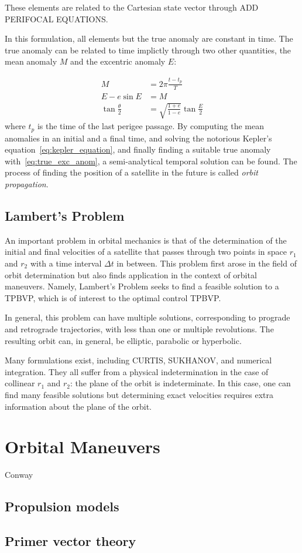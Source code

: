These elements are related to the Cartesian state vector through ADD PERIFOCAL EQUATIONS.

In this formulation, all elements but the true anomaly are constant in time. The true anomaly can be related to time implictly through two other quantities, the mean anomaly \(M\) and the excentric anomaly \(E\):

\begin{align} 
        M &= 2\pi \frac{t - t_p}{T} \\
        E - e \sin{E} &= M \label{eq:kepler_equation}\\
        \tan{\frac{\theta}{2}} &= \sqrt{\frac{1+e}{1-e}} \tan{\frac{E}{2}} \label{eq:true_exc_anom}
\end{align}
where \(t_p\) is the time of the last perigee passage. By computing the mean anomalies in an initial and a final time, and solving the notorious Kepler's equation~\eqref{eq:kepler_equation}, and finally finding a suitable true anomaly with~\eqref{eq:true_exc_anom}, a semi-analytical temporal solution can be found. The process of finding the position of a satellite in the future is called \textit{orbit propagation}.


\subsection{Lambert's Problem}

An important problem in orbital mechanics is that of the determination of the initial and final velocities of a satellite that passes through two points in space \(r_1\) and \(r_2\) with a time interval \(\Delta t\) in between. This problem first arose in the field of orbit determination but also finds application in the context of orbital maneuvers. Namely, Lambert's Problem seeks to find a feasible solution to a TPBVP, which is of interest to the optimal control TPBVP.

In general, this problem can have multiple solutions, corresponding to prograde and retrograde trajectories, with less than one or multiple revolutions. The resulting orbit can, in general, be elliptic, parabolic or hyperbolic. 

Many formulations exist, including CURTIS, SUKHANOV, and numerical integration. They all suffer from a physical indetermination in the case of collinear \(r_1\) and \(r_2\): the plane of the orbit is indeterminate. In this case, one can find many feasible solutions but determining exact velocities requires extra information about the plane of the orbit.\


\section{Orbital Maneuvers}
Conway
\subsection{Propulsion models}

\subsection{Primer vector theory}

